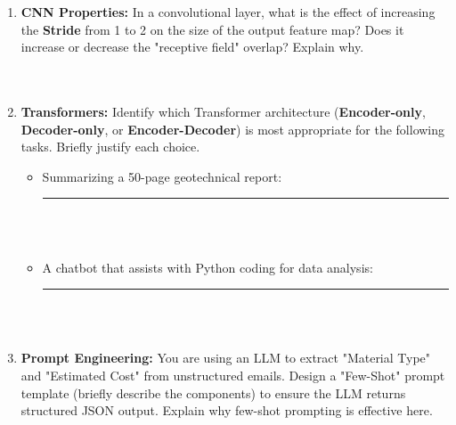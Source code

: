 \documentclass[12pt]{article}
\begin{document}
\begin{enumerate}[label=(\alph*)]
    \item \textbf{CNN Properties:} In a convolutional layer, what is the effect of increasing the \textbf{Stride} from 1 to 2 on the size of the output feature map? Does it increase or decrease the "receptive field" overlap? Explain why. \\
    
    \fullunderline \\
    
    \fullunderline \\
    

    \item \textbf{Transformers:} Identify which Transformer architecture (\textbf{Encoder-only}, \textbf{Decoder-only}, or \textbf{Encoder-Decoder}) is most appropriate for the following tasks. Briefly justify each choice.
    \begin{itemize}
        \item Summarizing a 50-page geotechnical report: \rule{1.5in}{0.15mm} \\
        
        \fullunderline \\
        
        \item A chatbot that assists with Python coding for data analysis: \rule{1.5in}{0.15mm} \\
        
        \fullunderline \\
        
    \end{itemize}

    \item \textbf{Prompt Engineering:} You are using an LLM to extract "Material Type" and "Estimated Cost" from unstructured emails. Design a "Few-Shot" prompt template (briefly describe the components) to ensure the LLM returns structured JSON output. Explain why few-shot prompting is effective here.
    \\
    
    \fullunderline \\
    
    \fullunderline \\
    
    \fullunderline \\
    
\end{enumerate}
\end{document}
